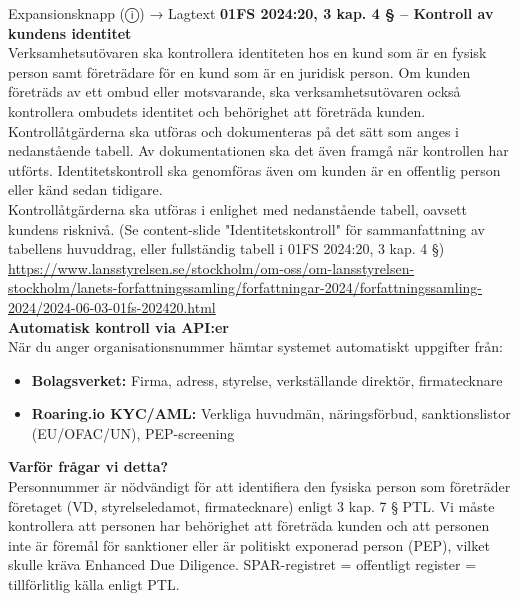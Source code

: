 \documentclass[10pt]{beamer}
\begin{document}
\begin{frame}[label=riskfragor-steg1]
\begin{alertblock}{Expansionsknapp (ⓘ) → Lagtext}
    \tiny \textbf{01FS 2024:20, 3 kap. 4 § – Kontroll av kundens identitet}\\
    \tiny Verksamhetsutövaren ska kontrollera identiteten hos en kund som är en fysisk 
    person samt företrädare för en kund som är en juridisk person. Om kunden företräds av ett 
    ombud eller motsvarande, ska verksamhetsutövaren också kontrollera ombudets identitet och 
    behörighet att företräda kunden.\\[0.1cm]

    \tiny Kontrollåtgärderna ska utföras och dokumenteras på det sätt som anges i nedanstående tabell.
    Av dokumentationen ska det även framgå när kontrollen har utförts. 
    Identitetskontroll ska genomföras även om kunden är en offentlig person eller känd sedan tidigare.\\[0.1cm]

    \tiny Kontrollåtgärderna ska utföras i enlighet med nedanstående tabell, oavsett kundens risknivå.
    (Se content-slide "Identitetskontroll" för sammanfattning av tabellens huvuddrag, eller 
    fullständig tabell i 01FS 2024:20, 3 kap. 4 §)\\
    \tiny \url{https://www.lansstyrelsen.se/stockholm/om-oss/om-lansstyrelsen-stockholm/lanets-forfattningssamling/forfattningar-2024/forfattningssamling-2024/2024-06-03-01fs-202420.html}\\[0.1cm]
    
    \tiny \textbf{Automatisk kontroll via API:er}\\
    \tiny När du anger organisationsnummer hämtar systemet automatiskt uppgifter från:
    \begin{itemize}
      \item \textbf{Bolagsverket:} Firma, adress, styrelse, verkställande direktör, firmatecknare
      \item \textbf{Roaring.io KYC/AML:} Verkliga huvudmän, näringsförbud, sanktionslistor (EU/OFAC/UN), PEP-screening
    \end{itemize}
    \vspace{0.1cm}
    
    
    \tiny \textbf{Varför frågar vi detta?}\\
    \tiny Personnummer är nödvändigt för att identifiera den fysiska person som företräder företaget (VD, styrelseledamot, firmatecknare) enligt 3 kap. 7 § PTL. Vi måste kontrollera att personen har behörighet att företräda kunden och att personen inte är föremål för sanktioner eller är politiskt exponerad person (PEP), vilket skulle kräva Enhanced Due Diligence. SPAR-registret = offentligt register = tillförlitlig källa enligt PTL.
  \end{alertblock}


\end{frame}
\end{document}
